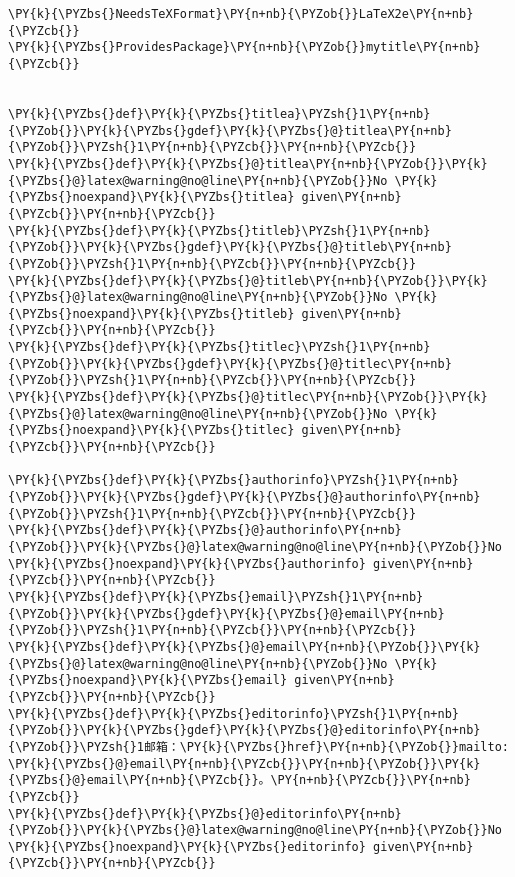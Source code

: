 \begin{Verbatim}[commandchars=\\\{\}]
\PY{k}{\PYZbs{}NeedsTeXFormat}\PY{n+nb}{\PYZob{}}LaTeX2e\PY{n+nb}{\PYZcb{}}
\PY{k}{\PYZbs{}ProvidesPackage}\PY{n+nb}{\PYZob{}}mytitle\PY{n+nb}{\PYZcb{}}


\PY{k}{\PYZbs{}def}\PY{k}{\PYZbs{}titlea}\PYZsh{}1\PY{n+nb}{\PYZob{}}\PY{k}{\PYZbs{}gdef}\PY{k}{\PYZbs{}@}titlea\PY{n+nb}{\PYZob{}}\PYZsh{}1\PY{n+nb}{\PYZcb{}}\PY{n+nb}{\PYZcb{}}
\PY{k}{\PYZbs{}def}\PY{k}{\PYZbs{}@}titlea\PY{n+nb}{\PYZob{}}\PY{k}{\PYZbs{}@}latex@warning@no@line\PY{n+nb}{\PYZob{}}No \PY{k}{\PYZbs{}noexpand}\PY{k}{\PYZbs{}titlea} given\PY{n+nb}{\PYZcb{}}\PY{n+nb}{\PYZcb{}}
\PY{k}{\PYZbs{}def}\PY{k}{\PYZbs{}titleb}\PYZsh{}1\PY{n+nb}{\PYZob{}}\PY{k}{\PYZbs{}gdef}\PY{k}{\PYZbs{}@}titleb\PY{n+nb}{\PYZob{}}\PYZsh{}1\PY{n+nb}{\PYZcb{}}\PY{n+nb}{\PYZcb{}}
\PY{k}{\PYZbs{}def}\PY{k}{\PYZbs{}@}titleb\PY{n+nb}{\PYZob{}}\PY{k}{\PYZbs{}@}latex@warning@no@line\PY{n+nb}{\PYZob{}}No \PY{k}{\PYZbs{}noexpand}\PY{k}{\PYZbs{}titleb} given\PY{n+nb}{\PYZcb{}}\PY{n+nb}{\PYZcb{}}
\PY{k}{\PYZbs{}def}\PY{k}{\PYZbs{}titlec}\PYZsh{}1\PY{n+nb}{\PYZob{}}\PY{k}{\PYZbs{}gdef}\PY{k}{\PYZbs{}@}titlec\PY{n+nb}{\PYZob{}}\PYZsh{}1\PY{n+nb}{\PYZcb{}}\PY{n+nb}{\PYZcb{}}
\PY{k}{\PYZbs{}def}\PY{k}{\PYZbs{}@}titlec\PY{n+nb}{\PYZob{}}\PY{k}{\PYZbs{}@}latex@warning@no@line\PY{n+nb}{\PYZob{}}No \PY{k}{\PYZbs{}noexpand}\PY{k}{\PYZbs{}titlec} given\PY{n+nb}{\PYZcb{}}\PY{n+nb}{\PYZcb{}}

\PY{k}{\PYZbs{}def}\PY{k}{\PYZbs{}authorinfo}\PYZsh{}1\PY{n+nb}{\PYZob{}}\PY{k}{\PYZbs{}gdef}\PY{k}{\PYZbs{}@}authorinfo\PY{n+nb}{\PYZob{}}\PYZsh{}1\PY{n+nb}{\PYZcb{}}\PY{n+nb}{\PYZcb{}}
\PY{k}{\PYZbs{}def}\PY{k}{\PYZbs{}@}authorinfo\PY{n+nb}{\PYZob{}}\PY{k}{\PYZbs{}@}latex@warning@no@line\PY{n+nb}{\PYZob{}}No \PY{k}{\PYZbs{}noexpand}\PY{k}{\PYZbs{}authorinfo} given\PY{n+nb}{\PYZcb{}}\PY{n+nb}{\PYZcb{}}
\PY{k}{\PYZbs{}def}\PY{k}{\PYZbs{}email}\PYZsh{}1\PY{n+nb}{\PYZob{}}\PY{k}{\PYZbs{}gdef}\PY{k}{\PYZbs{}@}email\PY{n+nb}{\PYZob{}}\PYZsh{}1\PY{n+nb}{\PYZcb{}}\PY{n+nb}{\PYZcb{}}
\PY{k}{\PYZbs{}def}\PY{k}{\PYZbs{}@}email\PY{n+nb}{\PYZob{}}\PY{k}{\PYZbs{}@}latex@warning@no@line\PY{n+nb}{\PYZob{}}No \PY{k}{\PYZbs{}noexpand}\PY{k}{\PYZbs{}email} given\PY{n+nb}{\PYZcb{}}\PY{n+nb}{\PYZcb{}}
\PY{k}{\PYZbs{}def}\PY{k}{\PYZbs{}editorinfo}\PYZsh{}1\PY{n+nb}{\PYZob{}}\PY{k}{\PYZbs{}gdef}\PY{k}{\PYZbs{}@}editorinfo\PY{n+nb}{\PYZob{}}\PYZsh{}1邮箱：\PY{k}{\PYZbs{}href}\PY{n+nb}{\PYZob{}}mailto: \PY{k}{\PYZbs{}@}email\PY{n+nb}{\PYZcb{}}\PY{n+nb}{\PYZob{}}\PY{k}{\PYZbs{}@}email\PY{n+nb}{\PYZcb{}}。\PY{n+nb}{\PYZcb{}}\PY{n+nb}{\PYZcb{}}
\PY{k}{\PYZbs{}def}\PY{k}{\PYZbs{}@}editorinfo\PY{n+nb}{\PYZob{}}\PY{k}{\PYZbs{}@}latex@warning@no@line\PY{n+nb}{\PYZob{}}No \PY{k}{\PYZbs{}noexpand}\PY{k}{\PYZbs{}editorinfo} given\PY{n+nb}{\PYZcb{}}\PY{n+nb}{\PYZcb{}}


\end{Verbatim}
